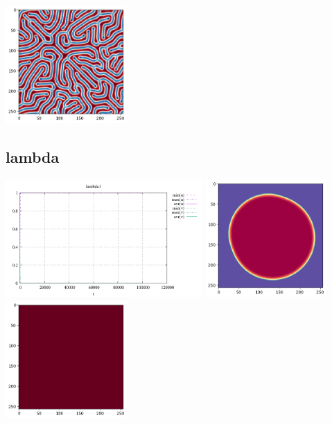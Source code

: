 \begin{center}
\includegraphics[height=4.5cm]{python_codes/fieldstone_171/results/kappa2_solution_final_v.png}
\end{center}

\subsection*{lambda}
\begin{center}
\includegraphics[height=4.5cm]{python_codes/fieldstone_171/results/lambda1_stats}
\includegraphics[height=4.5cm]{python_codes/fieldstone_171/results/lambda1_solution_final_u.png}
\includegraphics[height=4.5cm]{python_codes/fieldstone_171/results/lambda1_solution_final_v.png}\\

\end{center}
